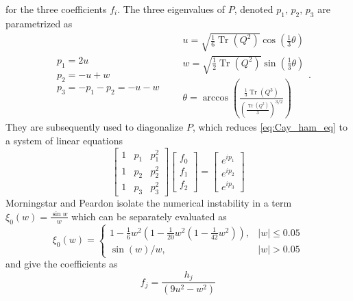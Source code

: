 \documentclass[a4paper,10pt]{book}
\begin{document}
for the three coefficients $f_i$. The three eigenvalues of $P$, denoted $p_1,\,p_2,\,p_3$ are parametrized as 
\begin{equation}
\begin{aligned}
&p_{1}=2 u \\
&p_{2}=-u+w\\
&p_{3}=-p_{1}-p_{2}=-u-w
\end{aligned}
\,\,\,\,\,
\begin{aligned}
&u=\sqrt{\frac{1}{6}\operatorname{Tr}\left(Q^{2}\right)} \cos \left(\frac{1}{3} \theta\right) \\
&w=\sqrt{\frac{1}{2} \operatorname{Tr}\left(Q^{2}\right)} \sin \left(\frac{1}{3} \theta\right) \\
&\theta=\arccos \left(\frac{\frac{1}{3} \operatorname{Tr}\left(Q^{3}\right)}{\left(\frac{ \operatorname{Tr}\left(Q^{2}\right)}{3}\right)^{3 / 2}}\right)
\end{aligned}.
\end{equation}
They are subsequently used to diagonalize $P$, which reduces \eqref{eq:Cay_ham_eq} to a system of linear equations
\begin{equation}
\left[\begin{array}{lll}
1 & p_{1} & p_{1}^{2} \\
1 & p_{2} & p_{2}^{2} \\
1 & p_{3} & p_{3}^{2}
\end{array}\right]\left[\begin{array}{l}
f_{0} \\
f_{1} \\
f_{2}
\end{array}\right]=\left[\begin{array}{c}
e^{i p_{1}} \\
e^{i p_{2}} \\
e^{i p_{3}}
\end{array}\right]
\end{equation}
Morningstar and Peardon isolate the numerical instability in a term $\xi_{0}(w)=\frac{\sin w}{w}$ which can be separately evaluated as 
\begin{equation}
\xi_{0}(w)= \begin{cases}1-\frac{1}{6} w^{2}\left(1-\frac{1}{20} w^{2}\left(1-\frac{1}{42} w^{2}\right)\right), & |w| \leqslant 0.05 \\ \sin (w) / w, & |w|>0.05\end{cases}
\end{equation}
and give the coefficients as 
\begin{equation}\label{eq:f_coeffs_equation}
f_{j}=\frac{h_{j}}{\left(9 u^{2}-w^{2}\right)}
\end{equation}
\end{document}

